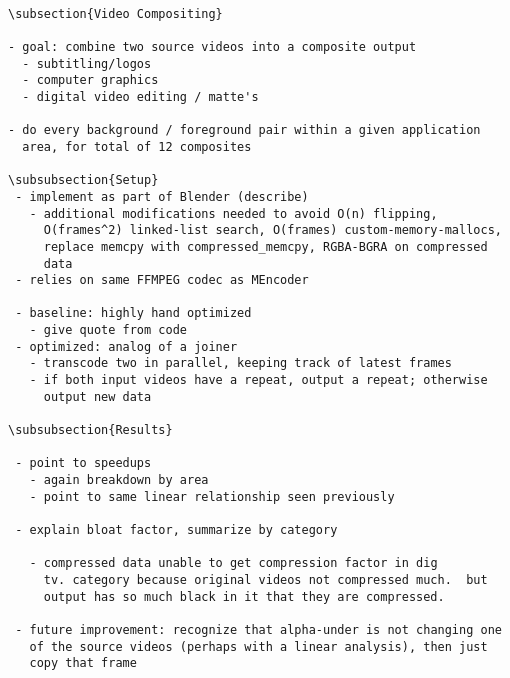 {\scriptsize
\begin{verbatim}

\subsection{Video Compositing}

- goal: combine two source videos into a composite output
  - subtitling/logos
  - computer graphics
  - digital video editing / matte's

- do every background / foreground pair within a given application
  area, for total of 12 composites

\subsubsection{Setup}
 - implement as part of Blender (describe)
   - additional modifications needed to avoid O(n) flipping,
     O(frames^2) linked-list search, O(frames) custom-memory-mallocs,
     replace memcpy with compressed_memcpy, RGBA-BGRA on compressed
     data
 - relies on same FFMPEG codec as MEncoder

 - baseline: highly hand optimized
   - give quote from code
 - optimized: analog of a joiner
   - transcode two in parallel, keeping track of latest frames
   - if both input videos have a repeat, output a repeat; otherwise
     output new data

\subsubsection{Results}

 - point to speedups
   - again breakdown by area
   - point to same linear relationship seen previously

 - explain bloat factor, summarize by category

   - compressed data unable to get compression factor in dig
     tv. category because original videos not compressed much.  but
     output has so much black in it that they are compressed.

 - future improvement: recognize that alpha-under is not changing one
   of the source videos (perhaps with a linear analysis), then just
   copy that frame

\end{verbatim}
}

